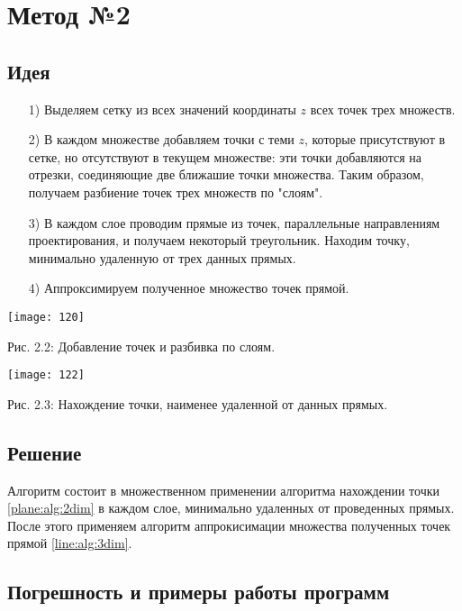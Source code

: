 \section{Метод №2}\label{meth2}

\subsection{Идея}\label{math2:idea}

\begin{itemize}
	\item[1)] Выделяем сетку из всех значений координаты $z$ всех точек трех множеств.
	\item[2)] В каждом множестве добавляем точки с теми $z$, которые присутствуют в сетке, но отсутствуют в текущем множестве: эти точки добавляются на отрезки, соединяющие две ближашие точки множества. Таким образом, получаем разбиение точек трех множеств по "слоям".
	\item[3)] В каждом слое проводим прямые из точек, параллельные направлениям проектирования, и получаем некоторый треугольник. Находим точку, минимально удаленную от трех данных прямых.
	\item[4)] Аппроксимируем полученное множество точек прямой. 
\end{itemize}

\begin{center}
	\texttt{[image: 120]}

	Рис. 2.2: Добавление точек и разбивка по слоям.

	\texttt{[image: 122]}

	Рис. 2.3: Нахождение точки, наименее удаленной от данных прямых.
\end{center}

\subsection{Решение}\label{math2:solution}

Алгоритм состоит в множественном применении алгоритма нахождении точки \ref{plane:alg:2dim} в каждом слое, минимально удаленных от проведенных прямых. После этого применяем алгоритм аппрокисимации множества полученных точек прямой \ref{line:alg:3dim}.

\subsection{Погрешность и примеры работы программ}\label{math2:error}

